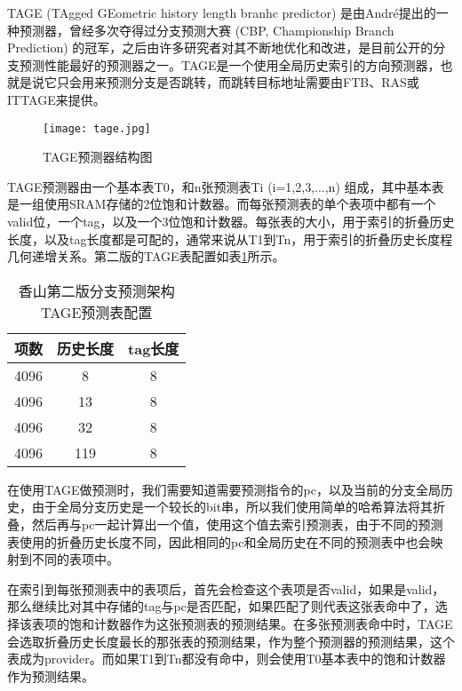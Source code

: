 TAGE (TAgged GEometric history length branhc predictor) 是由André提出的一种预测器\cite{tage}，曾经多次夺得过分支预测大赛 (CBP, Championship Branch Prediction) 的冠军，之后由许多研究者对其不断地优化和改进，是目前公开的分支预测性能最好的预测器之一。TAGE是一个使用全局历史索引的方向预测器，也就是说它只会用来预测分支是否跳转，而跳转目标地址需要由FTB、RAS或ITTAGE来提供。


\begin{figure}[htb]
	\centering
	\setlength\tabcolsep{3pt}  %
	\vspace{5pt} %
	\texttt{[image: tage.jpg]}
	\caption{TAGE预测器结构图\cite{tage}}
	\label{fig:figure23}
\end{figure}

TAGE预测器由一个基本表T0，和n张预测表Ti (i=1,2,3,...,n) 组成，其中基本表是一组使用SRAM存储的2位饱和计数器。而每张预测表的单个表项中都有一个valid位，一个tag，以及一个3位饱和计数器。每张表的大小，用于索引的折叠历史长度，以及tag长度都是可配的，通常来说从T1到Tn，用于索引的折叠历史长度程几何递增关系。第二版的TAGE表配置如表\ref{tb:table21}所示。

\begin{table}[]
	\caption{香山第二版分支预测架构TAGE预测表配置}
	\label{tb:table21}
	\centering
	\begin{tabular}{|c|c|c|}
		\hline
		项数   & 历史长度   & tag长度   \\ \hline
		4096 & 8 & 8 \\ \hline
		4096 & 13 & 8 \\ \hline
		4096 & 32 & 8 \\ \hline
		4096 & 119 & 8 \\ \hline
	\end{tabular}
\end{table}

在使用TAGE做预测时，我们需要知道需要预测指令的pc，以及当前的分支全局历史，由于全局分支历史是一个较长的bit串，所以我们使用简单的哈希算法将其折叠，然后再与pc一起计算出一个值，使用这个值去索引预测表，由于不同的预测表使用的折叠历史长度不同，因此相同的pc和全局历史在不同的预测表中也会映射到不同的表项中。

在索引到每张预测表中的表项后，首先会检查这个表项是否valid，如果是valid，那么继续比对其中存储的tag与pc是否匹配，如果匹配了则代表这张表命中了，选择该表项的饱和计数器作为这张预测表的预测结果。在多张预测表命中时，TAGE会选取折叠历史长度最长的那张表的预测结果，作为整个预测器的预测结果，这个表成为provider。而如果T1到Tn都没有命中，则会使用T0基本表中的饱和计数器作为预测结果。

